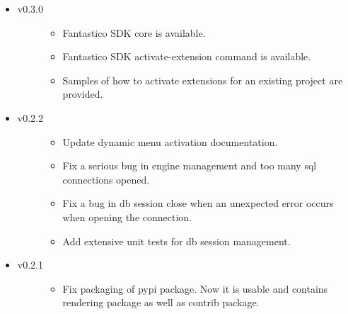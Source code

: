 \documentclass[letterpaper,10pt,english]{sphinxmanual}
\begin{document}
\begin{itemize}
\begin{description}
\end{description}

\item {} \begin{description}
\item[{v0.3.0}] \leavevmode\begin{itemize}
\item {} 
Fantastico SDK core is available.

\item {} 
Fantastico SDK activate-extension command is available.

\item {} 
Samples of how to activate extensions for an existing project are provided.

\end{itemize}

\end{description}

\item {} \begin{description}
\item[{v0.2.2}] \leavevmode\begin{itemize}
\item {} 
Update dynamic menu activation documentation.

\item {} 
Fix a serious bug in engine management and too many sql connections opened.

\item {} 
Fix a bug in db session close when an unexpected error occurs when opening the connection.

\item {} 
Add extensive unit tests for db session management.

\end{itemize}

\end{description}

\item {} \begin{description}
\item[{v0.2.1}] \leavevmode\begin{itemize}
\item {} 
Fix packaging of pypi package. Now it is usable and contains rendering package as well as contrib package.

\end{itemize}

\end{description}


\end{itemize}
\end{document}
